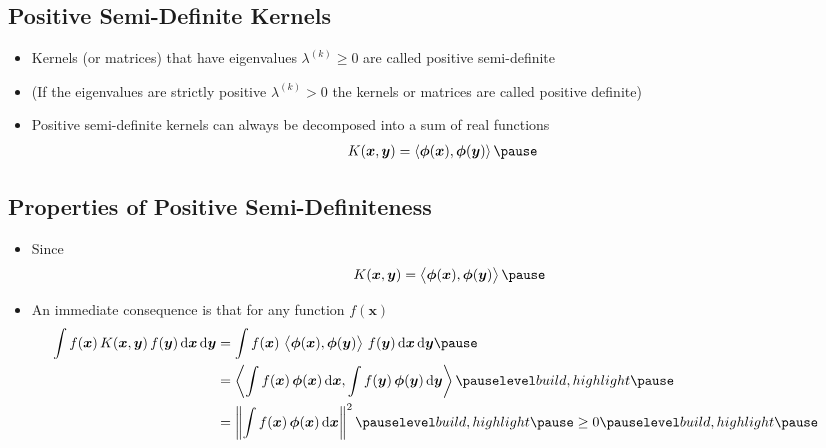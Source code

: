 \begin{slide}
\section{Positive Semi-Definite Kernels}

\begin{PauseHighLight}
  \begin{itemize}
  \item Kernels (or matrices) that have eigenvalues $\lambda^{(k)}\geq0$ are
    called positive semi-definite\pause
  \item (If the eigenvalues are strictly positive $\lambda^{(k)}>0$ the
    kernels or matrices are called positive definite)\pause
  \item Positive semi-definite kernels can always be decomposed into a
    sum of real functions
    \begin{align*}
      K(\bm{x}, \bm{y}) &= \inner{\bm{\phi}(\bm{x})}{\bm{\phi}(\bm{y})}\pause
    \end{align*}
  \end{itemize}
\end{PauseHighLight}


\end{slide}

\begin{slide}
\section[-1]{Properties of Positive Semi-Definiteness}

\begin{PauseHighLight}
  \begin{itemize}
  \item Since 
    \begin{align*}
      K(\bm{x}, \bm{y}) =  \inner{\strut\bm{\phi}(\bm{x})}{\bm{\phi}(\bm{y})}\pause
    \end{align*}
  \item An immediate consequence is that for any function $f(\bm{x})$
   \begin{align*}
      \hspace*{-2em}\int f(\bm{x})\, K(\bm{x}, \bm{y})\, f(\bm{y})\,\dd\bm{x}\, \dd
       \bm{y} &= \int f(\bm{x}) \,
                \inner{\strut\bm{\phi}(\bm{x})}{\bm{\phi}(\bm{y})}
                \, f(\bm{y})\,\dd\bm{x}\, \dd \bm{y}\pause  \\
      &=\inner{\int f(\bm{x})\,
        \bm{\phi}(\bm{x})\,\dd\bm{x}}{\int f(\bm{y})\,
        \bm{\phi}(\bm{y})\,\dd\bm{y}}\pauseb \\
     &= \left\| \int f(\bm{x})\,
        \bm{\phi}(\bm{x})\,\dd\bm{x}\right\|^2 \pauseb \geq 0\pauseb
    \end{align*}
  \end{itemize}
\end{PauseHighLight}


\end{slide}


